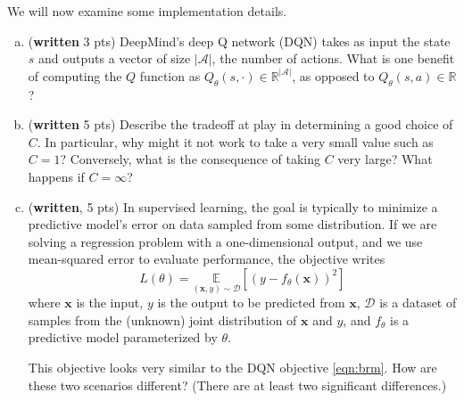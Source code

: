 \documentclass{article}
\newif\ifanswers
\newcommand{\ifans}[1]{\ifanswers \color{red} \textbf{Solution: } #1 \color{black} \else {} \fi}
\begin{document}
We will now examine some implementation details.
\begin{enumerate}[(a)]

\item (\textbf{written} 3 pts) DeepMind's deep Q network (DQN) takes as input the state $s$ and outputs a vector of size $|\mathcal{A}|$, the number of actions. What is one benefit of computing the $Q$ function as $Q_{\theta}(s, \cdot) \in \mathbb{R}^{|\mathcal{A}|}$, as opposed to $Q_{\theta}(s, a) \in \mathbb{R}$?

\ifans{
}

\item (\textbf{written} 5 pts) Describe the tradeoff at play in determining a good choice of $C$. In particular, why might it not work to take a very small value such as $C = 1$? Conversely, what is the consequence of taking $C$ very large? What happens if $C = \infty$?

\ifans{
}

\item (\textbf{written}, 5 pts) In supervised learning, the goal is typically to minimize a predictive model's error on data sampled from some distribution.
If we are solving a regression problem with a one-dimensional output, and we use mean-squared error to evaluate performance, the objective writes
\[
L(\theta) = \underset{(\mathbf{x},y) \sim \mathcal{D}}{\mathbb{E}}[(y - f_{\theta}(\mathbf{x}))^2]
\]
where $\mathbf{x}$ is the input, $y$ is the output to be predicted from $\mathbf{x}$, $\mathcal{D}$ is a dataset of samples from the (unknown) joint distribution of $\mathbf{x}$ and $y$, and $f_{\theta}$ is a predictive model parameterized by $\theta$.

This objective looks very similar to the DQN objective \eqref{eqn:brm}. How are these two scenarios different? (There are at least two significant differences.)

\ifans{
}
\end{enumerate}
\end{document}

